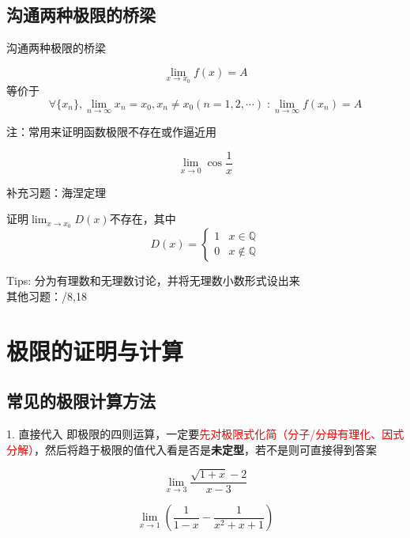 \documentclass{myslide}
\begin{document}
\subsection{沟通两种极限的桥梁}
\begin{frame}{沟通两种极限的桥梁}
\begin{theorem}[海涅定理]
\[\lim_{x\to x_0}f(x)=A\]
等价于\[\forall\{x_n\},\lim_{n\to\infty}x_n=x_0,x_n\ne x_0(n=1,2,\cdots)\;:\lim_{n\to \infty}f(x_n)=A\]
\end{theorem}
注：常用来证明函数极限不存在或作逼近用
\begin{example}[\textsection 3.3/11]
\[\lim_{x\to 0}\cos\frac{1}{x}\]
\end{example}
\end{frame}

\begin{frame}{补充习题：海涅定理}
\begin{exercise}[\textsection 3.3/12]
证明$\lim_{x\to x_0}D(x)$不存在，其中
\[D(x)=\begin{cases}1&x\in\mathbb{Q}\\0&x\notin\mathbb{Q}\end{cases}\]
\end{exercise}
Tips: 分为有理数和无理数讨论，并将无理数小数形式设出来\\
其他习题：/8,18
\end{frame}


\section{极限的证明与计算}
\begin{frame}
\sectionpage
\end{frame}

\subsection{常见的极限计算方法}
\begin{frame}
\subsectionpage
\end{frame}

\begin{frame}{1. 直接代入}
即极限的四则运算，一定要\textcolor{red}{先对极限式化简（分子/分母有理化、因式分解）}，然后将趋于极限的值代入看是否是\textbf{未定型}，若不是则可直接得到答案
\begin{example}[\textsection 3.3/2(5)]
\[\lim_{x\to 3}\frac{\sqrt{1+x}-2}{x-3}\]
\end{example}
\begin{example}[17数分期中]
\[\lim_{x\to 1}\left(\frac{1}{1-x}-\frac{1}{x^2+x+1}\right)\]
\end{example}
\end{frame}
\end{document}
